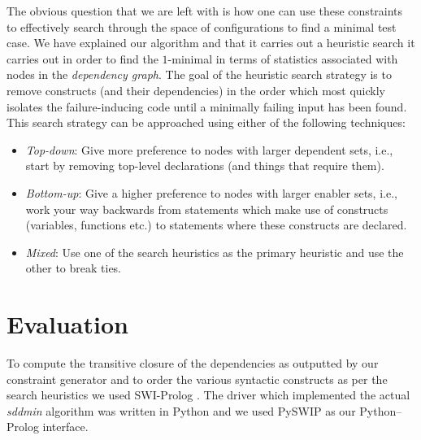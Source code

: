 \documentclass[preprint]{acm_proc_article-sp}
\begin{document}
The obvious question that we are left with is how one can use these constraints
to effectively search through the space of configurations to find a minimal test
case. We have explained our algorithm and that it carries out a heuristic search
it carries out in order to find the $1$-minimal in terms of statistics
associated with nodes in the \emph{dependency graph}. The goal of the heuristic
search strategy is to remove constructs (and their dependencies) in the order
which most quickly isolates the failure-inducing code until a minimally failing
input has been found. This search strategy can be approached using either of the
following techniques:
\begin{itemize}
\item \emph{Top-down}: Give more preference to nodes with larger dependent
  sets, i.e., start by removing top-level declarations (and things that
  require them).
\item \emph{Bottom-up}: Give a higher preference to nodes with larger enabler
  sets, i.e., work your way backwards from statements which make use of
  constructs (variables, functions etc.) to statements where these constructs
  are declared.
\item \emph{Mixed}: Use one of the search heuristics as the primary heuristic
  and use the other to break ties.
\end{itemize}



\section{Evaluation}
To compute the transitive closure of the dependencies as outputted by our
constraint generator and to order the various syntactic constructs as per the
search heuristics we used SWI-Prolog \citep{swipl}. The driver which implemented
the actual \emph{sddmin} algorithm was written in Python and we used PySWIP
\citep{pyswip} as our Python--Prolog interface.
\end{document}
